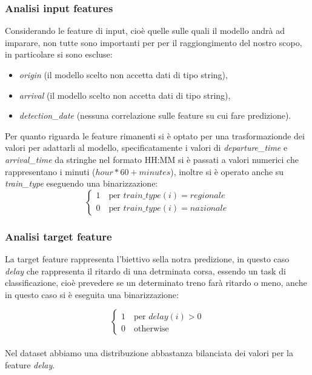 \documentclass[italian,12pt,a4paper]{article}
\begin{document}
		\subsubsection{Analisi input features}
			Considerando le feature di input, cioè quelle sulle quali il modello andrà ad imparare, non tutte sono importanti per per il raggiongimento del nostro scopo, in particolare si sono escluse:
			
			\begin{itemize}
				\item \textit{origin} (il modello scelto non accetta dati di tipo string),
				\item \textit{arrival} (il modello scelto non accetta dati di tipo string),
				\item \textit{detection\_date} (nessuna correlazione sulle feature su cui fare predizione).
			\end{itemize}
			Per quanto riguarda le feature rimanenti si è optato per una trasformazionde dei valori per adattarli al modello, specificatamente i valori di \textit{departure\_time} e \textit{arrival\_time} da stringhe nel formato HH:MM si è passati a valori numerici che rappresentano i minuti ($hour*60+minutes$), inoltre si è operato anche su \textit{train\_type} eseguendo una binarizzazione:
			\begin{equation*}
				\begin{cases}
					1 \quad \text{per } train\_type(i) = regionale \\
					0 \quad \text{per } train\_type(i) = nazionale
				\end{cases}
			\end{equation*}
			
		\subsubsection{Analisi target feature}
			La target feature rappresenta l'biettivo sella notra predizione, in questo caso \textit{delay} che rappresenta il ritardo di una detrminata corsa, essendo un task di classificazione, cioè prevedere se un determinato treno farà ritardo o meno, anche in questo caso si è eseguita una binarizzazione:
			
			\begin{equation*}
				\begin{cases}
					1 \quad \text{per } delay(i) > 0  \\
					0 \quad \text{otherwise}
				\end{cases}
			\end{equation*}
			\linebreak
			\\
			Nel dataset abbiamo una distribuzione abbastanza bilanciata dei valori per la feature \textit{delay}.
			
\end{document}
